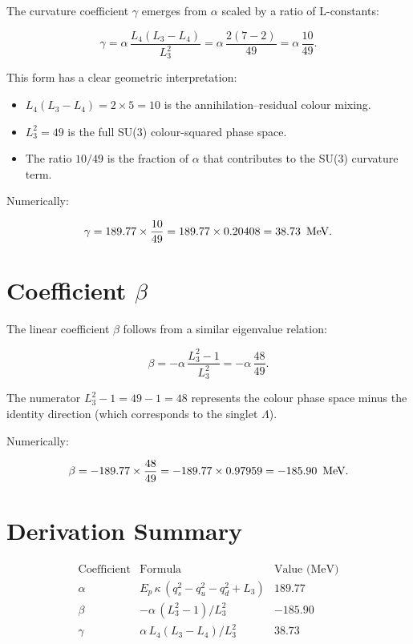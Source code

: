 The curvature coefficient \(\gamma\) emerges from \(\alpha\) scaled by a
ratio of L-constants:

\begin{equation}
\gamma = \alpha\,\frac{L_4(L_3 - L_4)}{L_3^2}
       = \alpha\,\frac{2(7-2)}{49}
       = \alpha\,\frac{10}{49}.
\label{eq:gamma}
\end{equation}

This form has a clear geometric interpretation:
\begin{itemize}
\item \(L_4(L_3 - L_4) = 2 \times 5 = 10\) is the annihilation--residual
colour mixing.
\item \(L_3^2 = 49\) is the full SU(3) colour-squared phase space.
\item The ratio \(10/49\) is the fraction of \(\alpha\) that contributes
to the SU(3) curvature term.
\end{itemize}

Numerically:

\[
\gamma = 189.77 \times \frac{10}{49}
       = 189.77 \times 0.20408
       = 38.73\ \,\text{MeV}.
\]

\section{Coefficient \(\beta\)}

The linear coefficient \(\beta\) follows from a similar eigenvalue
relation:

\begin{equation}
\beta = -\alpha\,\frac{L_3^2 - 1}{L_3^2}
       = -\alpha\,\frac{48}{49}.
\label{eq:beta}
\end{equation}

The numerator \(L_3^2 - 1 = 49 - 1 = 48\) represents the colour
phase space minus the identity direction (which corresponds to the
singlet \(\Lambda\)).

Numerically:

\[
\beta = -189.77 \times \frac{48}{49}
       = -189.77 \times 0.97959
       = -185.90\ \,\text{MeV}.
\]

\section{Derivation Summary}

\[
\begin{array}{cclc}
\text{Coefficient} & \text{Formula} & \text{Value (MeV)} \\
\hline
\alpha & E_p\,\kappa\,(q_s^2 - q_u^2 - q_d^2 + L_3) & 189.77 \\
\beta   & -\alpha\,(L_3^2 - 1)/L_3^2 & -185.90 \\
\gamma  & \alpha\,L_4(L_3 - L_4)/L_3^2 & 38.73
\end{array}
\]

